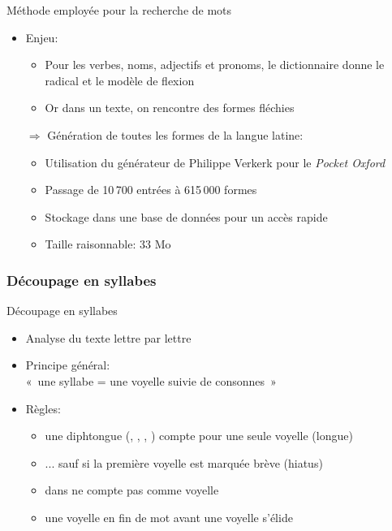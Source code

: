 \documentclass{beamer}
\newcommand{\lettre}[1]{\emph{\structure{#1}}}
\begin{document}
\begin{frame}{Méthode employée pour la recherche de mots}

\begin{itemize}

\item Enjeu:

\begin{itemize}
\item Pour les verbes, noms, adjectifs et pronoms, le dictionnaire donne le radical et le modèle de flexion
\item Or dans un texte, on rencontre des formes fléchies
\end{itemize}

\vfill

\item[$\Rightarrow$] Génération de toutes les formes de la langue latine:

\begin{itemize}
\item Utilisation du générateur de Philippe Verkerk pour le \emph{Pocket Oxford}
\item Passage de 10\,700 entrées à 615\,000 formes
\item Stockage dans une base de données pour un accès rapide
\item Taille raisonnable: 33 Mo
\end{itemize}

\end{itemize}

\end{frame} %


\subsubsection{Découpage en syllabes}

\begin{frame}{Découpage en syllabes}

\begin{itemize}
\item Analyse du texte lettre par lettre
\item Principe général:\\ «~une syllabe = une voyelle suivie de consonnes~»
\item Règles:

\begin{itemize}
\item une diphtongue (\lettre{ae}, \lettre{oe}, \lettre{eu}, \lettre{au}) compte pour une seule voyelle (longue)
\item ... sauf si la première voyelle est marquée brève (hiatus)
\item \lettre{u} dans \lettre{qu} ne compte pas comme voyelle
\item une voyelle en fin de mot avant une voyelle s'élide
\end{itemize}

\end{itemize}
\end{frame} %
\end{document}
